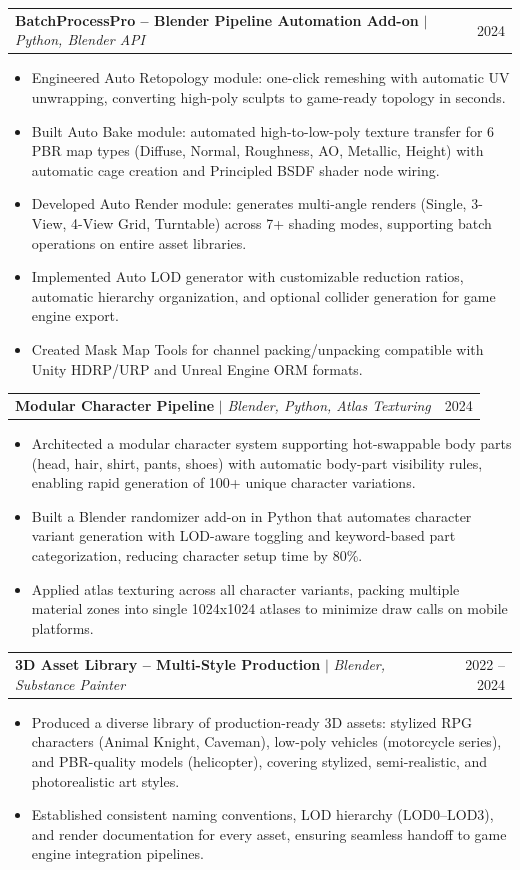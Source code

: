 \documentclass[letterpaper,11pt]{article}
\makeatletter
\newcommand{\resumeItem}[1]{
  \item\small{
    {#1 \vspace{-2pt}}
  }
}
\newcommand{\resumeProjectHeading}[2]{
    \item
    \begin{tabular*}{0.97\textwidth}{l@{\extracolsep{\fill}}r}
      \small#1 & #2 \\
    \end{tabular*}\vspace{-7pt}
}
\newcommand{\resumeItemListStart}{\begin{itemize}}
\newcommand{\resumeItemListEnd}{\end{itemize}\vspace{-5pt}}
\makeatother
\begin{document}
      \resumeProjectHeading
          {\textbf{BatchProcessPro -- Blender Pipeline Automation Add-on} $|$ \emph{Python, Blender API}}{2024}
          \resumeItemListStart
            \resumeItem{Engineered Auto Retopology module: one-click remeshing with automatic UV unwrapping, converting high-poly sculpts to game-ready topology in seconds.}
            \resumeItem{Built Auto Bake module: automated high-to-low-poly texture transfer for 6 PBR map types (Diffuse, Normal, Roughness, AO, Metallic, Height) with automatic cage creation and Principled BSDF shader node wiring.}
            \resumeItem{Developed Auto Render module: generates multi-angle renders (Single, 3-View, 4-View Grid, Turntable) across 7+ shading modes, supporting batch operations on entire asset libraries.}
            \resumeItem{Implemented Auto LOD generator with customizable reduction ratios, automatic hierarchy organization, and optional collider generation for game engine export.}
            \resumeItem{Created Mask Map Tools for channel packing/unpacking compatible with Unity HDRP/URP and Unreal Engine ORM formats.}
          \resumeItemListEnd

      \resumeProjectHeading
          {\textbf{Modular Character Pipeline} $|$ \emph{Blender, Python, Atlas Texturing}}{2024}
          \resumeItemListStart
            \resumeItem{Architected a modular character system supporting hot-swappable body parts (head, hair, shirt, pants, shoes) with automatic body-part visibility rules, enabling rapid generation of 100+ unique character variations.}
            \resumeItem{Built a Blender randomizer add-on in Python that automates character variant generation with LOD-aware toggling and keyword-based part categorization, reducing character setup time by 80\%.}
            \resumeItem{Applied atlas texturing across all character variants, packing multiple material zones into single 1024x1024 atlases to minimize draw calls on mobile platforms.}
          \resumeItemListEnd

      \resumeProjectHeading
          {\textbf{3D Asset Library -- Multi-Style Production} $|$ \emph{Blender, Substance Painter}}{2022 -- 2024}
          \resumeItemListStart
            \resumeItem{Produced a diverse library of production-ready 3D assets: stylized RPG characters (Animal Knight, Caveman), low-poly vehicles (motorcycle series), and PBR-quality models (helicopter), covering stylized, semi-realistic, and photorealistic art styles.}
            \resumeItem{Established consistent naming conventions, LOD hierarchy (LOD0--LOD3), and render documentation for every asset, ensuring seamless handoff to game engine integration pipelines.}
          \resumeItemListEnd
\end{document}
